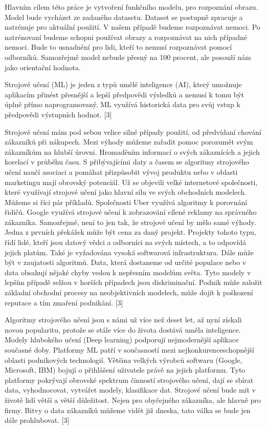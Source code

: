 \documentclass[journal]{IEEEtran}
\begin{document}
Hlavním cílem této práce je vytvoření funkčního modelu, pro rozpoznání obrazu. Model bude vycházet ze zadaného datasetu. Dataset se postupně zpracuje a natrénuje pro aktuální použití. V našem případě budeme rozpoznávat nemoci. Po natrénovaní budeme schopni používat obrazy a rozpoznávat na nich případné nemoci. Bude to usnadnění pro lidi, kteří to nemusí rozpoznávat pomocí odborníků. Samozřejmě model nebude přesný na 100 procent, ale posouží nám jako orientační hodnota.

Strojové učení (ML) je jeden z typů umělé inteligence (AI), který umožnuje aplikacím přinést přesnější a lepší předpovědi výsledků a nemusí k tomu být úplně přímo naprogramovaný. ML využívá historická data pro svůj vstup k předpovědi výstupních hodnot. [3]

Strojové učení mám pod sebou velice silné případy použití, od předvídaní chování zákazníků při nákupech. Mezi výhody můžeme zařadit pomoc porozumět svým zákazníkům na hlubší úrovni. Hromaděním informací o svých zákaznících a jejich korelací v průběhu času. S přibývajícími daty a časem se algoritmy strojového učení naučí asociaci a pomáhat přizpůsobit vývoj produktu nebo v oblasti marketingu mají obrovský potenciál. 
Už se objevili velké internetové společnosti, které využívají strojové učení jako hlavní sílu ve svých obchodních modelech. Můžeme si říci pár příkladů. Společnosti Uber využívá algoritmy k porovnání řidičů. Google využívá strojové učení k zobrazování cílené reklamy na správného zákazníka. 
Samozřejmě, není to jen tak, že strojové učení by mělo samé výhody. Jedna z prvních překážek může být cena za daný projekt. Projekty tohoto typu, řídí lidé, kteří jsou datový vědci a odborníci na svých místech, a to odpovídá jejich platům. Také je vyžadována vysoká softwarová infrastruktura. 
Dále může být v zaujatosti algoritmů. Data, která dostaneme od určité populace nebo v data obsahují nějaké chyby vedou k nepřesním modelům světa. Tyto modely v lepším případě selžou v horších případech jsou diskriminační. Podnik může založit základní obchodní procesy na neobjektivních modelech, může dojít k poškození reputace a tím zmaření podnikání. [3] 

Algoritmy strojového učení jsou s námi už více než deset let, až nyní získali novou popularitu, protože se stále více do života dostává uměla inteligence. Modely hlubokého učení (Deep learning) podporují nejmodernější aplikace současné doby. 
Platformy ML patří v současností mezi nejkonkurenceschopnější oblasti podnikových technologií. Většina velkých výrobců softwaru (Google, Microsoft, IBM) bojují o přihlášení uživatele právě na jejich platformu. Tyto platformy pokrývají obrovské spektrum činností strojového učení, dají se sbírat data, vyhodnocovat, vytvářet modely, klasifikace dat. 
Strojové učení bude mít v životě lidí větší a větší důležitost. Nejen pro obyčejného zákazníka, ale hlavně pro firmy. Bitvy o data zákazníků můžeme vidět již dneska, tato válka se bude jen dále prohlubovat. [3]
\end{document}
